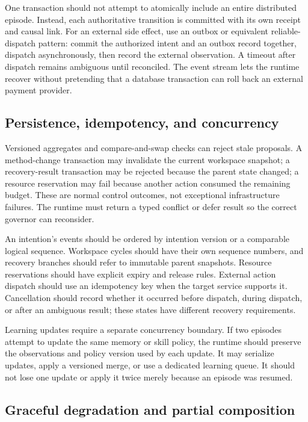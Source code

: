 One transaction should not attempt to atomically include an entire distributed episode. Instead, each authoritative transition is committed with its own receipt and causal link. For an external side effect, use an outbox or equivalent reliable-dispatch pattern: commit the authorized intent and an outbox record together, dispatch asynchronously, then record the external observation. A timeout after dispatch remains ambiguous until reconciled. The event stream lets the runtime recover without pretending that a database transaction can roll back an external payment provider.

\subsection{Persistence, idempotency, and concurrency}
\label{subsec:ch18-persistence-concurrency}

Versioned aggregates and compare-and-swap checks can reject stale proposals. A method-change transaction may invalidate the current workspace snapshot; a recovery-result transaction may be rejected because the parent state changed; a resource reservation may fail because another action consumed the remaining budget. These are normal control outcomes, not exceptional infrastructure failures. The runtime must return a typed conflict or defer result so the correct governor can reconsider.

An intention's events should be ordered by intention version or a comparable logical sequence. Workspace cycles should have their own sequence numbers, and recovery branches should refer to immutable parent snapshots. Resource reservations should have explicit expiry and release rules. External action dispatch should use an idempotency key when the target service supports it. Cancellation should record whether it occurred before dispatch, during dispatch, or after an ambiguous result; these states have different recovery requirements.

Learning updates require a separate concurrency boundary. If two episodes attempt to update the same memory or skill policy, the runtime should preserve the observations and policy version used by each update. It may serialize updates, apply a versioned merge, or use a dedicated learning queue. It should not lose one update or apply it twice merely because an episode was resumed.

\subsection{Graceful degradation and partial composition}
\label{subsec:ch18-graceful-degradation}

